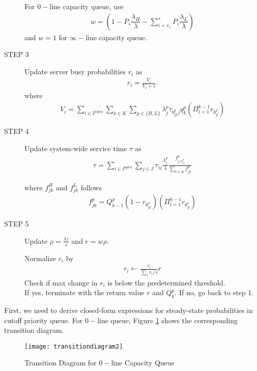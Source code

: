 \documentclass{article}
\begin{document}
\begin{description}
For $0-$line capacity queue, use
\begin{align}
w = (1-P_s \dfrac{\lambda_H}{\lambda}-\sum_{i=s_1}^s P_{i} \dfrac{\lambda_L}{\lambda})
\end{align}
and $w=1$ for $\infty-$line capacity queue.


\item[STEP 3] Update server busy probabilities $r_i$ as
\begin{align}
r_i = \frac{V_i}{V_i+1}.
\end{align}
where
\begin{align}
V_i = \sum_{i \in I^{Open}} \sum_{k \in K} \sum_{p \in \{H,L\}} \lambda^p_j \tau_{b^p_{jk}j} q^p_k (\Pi^{k-1}_{l=1} r_{b^p_{jl}})
\end{align}


\item[STEP 4] Update system-wide service time $\tau$ as
\begin{align}
\tau = \sum_{i \in I^{open}} \sum_{j \in J} \tau_{ij} \frac{\lambda^p_j}{\lambda}\frac{f^p_{j,a^p_{ij}}}{\sum_{k \in K} f^p_{jk}}
\end{align}

where $f^H_{jk}$ and $f^L_{jk}$ follows
\begin{align}
f^p_{jk} = Q^p_{k-1} (1-r_{b^p_{jk}}) (\Pi^{k-1}_{l=1} r_{b^p_{jl}})
\end{align}

\item[STEP 5] Update $\rho=\frac{\lambda \tau}{s}$ and $r = w \rho$.

Normalize $r_i$ by
\begin{align}
r_i \leftarrow \frac{r_i}{\sum_i r_i/s} r
\end{align}
Check if max change in $r_i$ is below the predetermined threshold. \\
If yes, terminate with the return value $r$ and $Q_k^p$. If no, go back to step 1.

\end{description}

First, we need to derive closed-form expressions for steady-state probabilities in cutoff priority queue. For $0-$line queue, Figure \ref{fig:transitiondiagram} shows the corresponding transition diagram.

\begin{figure}
\centering
\texttt{[image: transitiondiagram2]}
\caption{Transition Diagram for $0-$line Capacity Queue}
\label{fig:transitiondiagram}
\end{figure}
\end{document}
